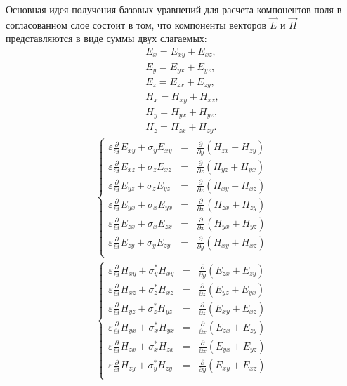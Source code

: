 Основная идея получения базовых уравнений для расчета компонентов поля
в согласованном слое состоит в том, что компоненты векторов $\vec{E}$
и $\vec{H}$ представляются в виде суммы двух слагаемых:
\begin{align}
\label{eq:PmlSplitFieldEquations}
    E_x = E_{xy}+E_{xz}, \\
    E_y = E_{yx}+E_{yz}, \\
    E_z = E_{zx}+E_{zy}, \\
    H_x = H_{xy}+H_{xz}, \\
    H_y = H_{yx}+H_{yz}, \\
    H_z = H_{zx}+H_{zy}.
\end{align}
\begin{eqnarray}
\label{eq:pml13}
\left\{
\begin{array}{rcl}
  \varepsilon \frac{\partial}{\partial t}E_{xy} + \sigma_y E_{xy} & = & \frac{\partial}{\partial y}(H_{zx}+H_{zy}) \\
  \varepsilon \frac{\partial}{\partial t}E_{xz} + \sigma_z E_{xz} & = & \frac{\partial}{\partial z}(H_{yz}+H_{yx}) \\
  \varepsilon \frac{\partial}{\partial t}E_{yz} + \sigma_z E_{yz} & = & \frac{\partial}{\partial z}(H_{xy}+H_{xz}) \\
  \varepsilon \frac{\partial}{\partial t}E_{yx} + \sigma_x E_{yx} & = & \frac{\partial}{\partial x}(H_{zx}+H_{zy}) \\
  \varepsilon \frac{\partial}{\partial t}E_{zx} + \sigma_x E_{zx} & = & \frac{\partial}{\partial x}(H_{yx}+H_{yz}) \\
  \varepsilon \frac{\partial}{\partial t}E_{zy} + \sigma_y E_{zy} & = & \frac{\partial}{\partial y}(H_{xy}+H_{xz}) \\
\end{array}
\right.
  \\ %
\left\{
\begin{array}{rcl}
  \varepsilon \frac{\partial}{\partial t}H_{xy} + \sigma_y^* H_{xy} & = & \frac{\partial}{\partial y}(E_{zx}+E_{zy}) \\
  \varepsilon \frac{\partial}{\partial t}H_{xz} + \sigma_z^* H_{xz} & = & \frac{\partial}{\partial z}(E_{yz}+E_{yx}) \\
  \varepsilon \frac{\partial}{\partial t}H_{yz} + \sigma_z^* H_{yz} & = & \frac{\partial}{\partial z}(E_{xy}+E_{xz}) \\
  \varepsilon \frac{\partial}{\partial t}H_{yx} + \sigma_x^* H_{yx} & = & \frac{\partial}{\partial x}(E_{zx}+E_{zy}) \\
  \varepsilon \frac{\partial}{\partial t}H_{zx} + \sigma_x^* H_{zx} & = & \frac{\partial}{\partial x}(E_{yx}+E_{yz}) \\
  \varepsilon \frac{\partial}{\partial t}H_{zy} + \sigma_y^* H_{zy} & = & \frac{\partial}{\partial y}(E_{xy}+E_{xz}) \\
\end{array}
\right.
\end{eqnarray}

